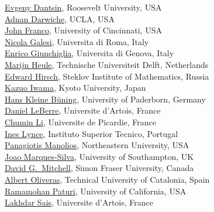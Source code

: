 \documentclass[10pt]{article}
\begin{document}
\begin{minipage}[t]{7.5cm}
{          \href{http://cs.roosevelt.edu/~dantsin/}{Evgeny Dantsin}, Roosevelt University, USA \\
          \href{http://www.cs.ucla.edu/~darwiche/}{Adnan Darwiche}, UCLA, USA \\
          \href{http://www.ececs.uc.edu/~franco/}{John Franco}, University of Cincinnati, USA  \\
          \href{http://www.dsi.uniroma1.it/~galesi/}{Nicola Galesi}, Universita di Roma, Italy  \\
          \href{http://www.star.dist.unige.it/index.php?option=com_uhp2&task=viewpage&item_id=50&user_id=74}{Enrico Giunchiglia}, Universita di Genova, Italy \\
          \href{http://www.st.ewi.tudelft.nl/~marijn/}{Marijn Heule}, Technische Universiteit Delft, Netherlands \\
          \href{http://logic.pdmi.ras.ru/~hirsch/}{Edward Hirsch}, Steklov Institute of Mathematics, Russia  \\
          \href{http://www.lab2.kuis.kyoto-u.ac.jp/~iwama/}{Kazuo Iwama}, Kyoto University, Japan  \\
          \href{http://wwwcs.uni-paderborn.de/cs/ag-klbue/en/staff/kbcsl/index.html}{Hans Kleine B\"uning}, University of Paderborn, Germany  \\
          \href{http://www.cril.univ-artois.fr/~leberre/}{Daniel LeBerre}, Universite d'Artois, France  \\
          \href{http://www.laria.u-picardie.fr/~cli/}{Chumin Li}, Universite de Picardie, France  \\
          \href{http://sat.inesc-id.pt/~ines/}{Ines Lynce}, Instituto Superior Tecnico, Portugal \\
          \href{http://www.ccs.neu.edu/home/pete}{Panagiotis Manolios}, Northeastern University, USA  \\
          \href{http://users.ecs.soton.ac.uk/jpms/}{Joao Marques-Silva}, University of Southampton, UK  \\
          \href{http://www.cs.sfu.ca/~mitchell/}{David G.\ Mitchell}, Simon Fraser University, Canada  \\
          \href{http://www.lsi.upc.edu/~oliveras/}{Albert Oliveras}, Technical University of Catalonia, Spain  \\
          \href{http://www-cse.ucsd.edu/~paturi/}{Ramamohan Paturi}, University of California, USA  \\
          \href{http://www.cril.univ-artois.fr/~sais/}{Lakhdar Sais}, Universite d'Artois, France  \\
}
\end{minipage}
\end{document}
